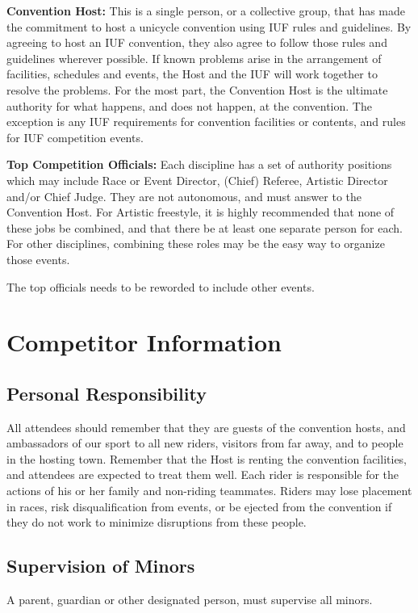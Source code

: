 \textbf{Convention Host:} This is a single person, or a collective group, that has made the commitment to host a unicycle convention using IUF rules and guidelines.
By agreeing to host an IUF convention, they also agree to follow those rules and guidelines wherever possible.
If known problems arise in the arrangement of facilities, schedules and events, the Host and the IUF will work together to resolve the problems.
For the most part, the Convention Host is the ultimate authority for what happens, and does not happen, at the convention.
The exception is any IUF requirements for convention facilities or contents, and rules for IUF competition events.

\textbf{Top Competition Officials:} Each discipline has a set of authority positions which may include Race or Event Director, (Chief) Referee, Artistic Director and/or Chief Judge.
They are not autonomous, and must answer to the Convention Host.
For Artistic freestyle, it is highly recommended that none of these jobs be combined, and that there be at least one separate person for each.
For other disciplines, combining these roles may be the easy way to organize those events.

\begin{comment2016}
The top officials needs to be reworded to include other events.
\end{comment2016}

\chapter{Competitor Information}

\section{Personal Responsibility}
All attendees should remember that they are guests of the convention hosts, and ambassadors of our sport to all new riders, visitors from far away, and to people in the hosting town.
Remember that the Host is renting the convention facilities, and attendees are expected to treat them well.
Each rider is responsible for the actions of his or her family and non-riding teammates.
Riders may lose placement in races, risk disqualification from events, or be ejected from the convention if they do not work to minimize disruptions from these people.

\section{Supervision of Minors}
A parent, guardian or other designated person, must supervise all minors.

